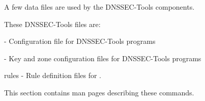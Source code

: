 
A few data files are used by the DNSSEC-Tools components.

These DNSSEC-Tools files are:

\begin{description}

\item{} - Configuration file for DNSSEC-Tools programs

\item{} - Key and zone configuration files for DNSSEC-Tools
programs

\item{ rules} - Rule definition files for .

\end{description}

This section contains man pages describing these commands.




